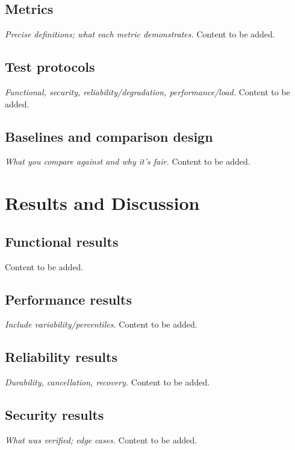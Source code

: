 \documentclass[a4paper,twoside]{sapthesis}
\begin{document}
\section{Metrics}
\label{sec:metrics}
\emph{Precise definitions; what each metric demonstrates.} Content to be added.

\section{Test protocols}
\label{sec:test-protocols}
\emph{Functional, security, reliability/degradation, performance/load.} Content to be added.

\section{Baselines and comparison design}
\label{sec:baselines}
\emph{What you compare against and why it's fair.} Content to be added.


\chapter{Results and Discussion}
\label{ch:results}

\section{Functional results}
\label{sec:functional-results}
Content to be added.

\section{Performance results}
\label{sec:performance-results}
\emph{Include variability/percentiles.} Content to be added.

\section{Reliability results}
\label{sec:reliability-results}
\emph{Durability, cancellation, recovery.} Content to be added.

\section{Security results}
\label{sec:security-results}
\emph{What was verified; edge cases.} Content to be added.
\end{document}
